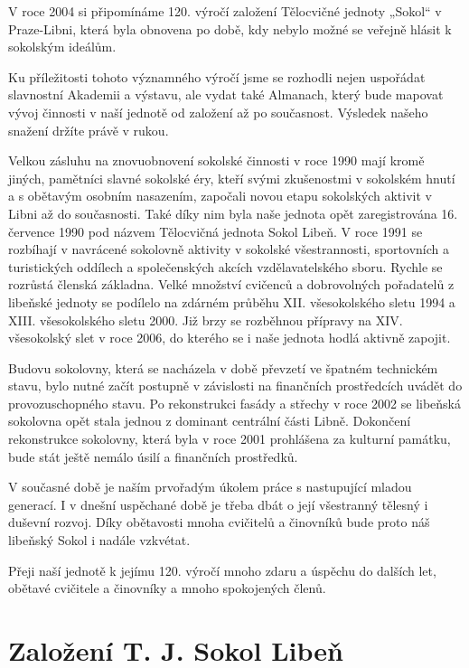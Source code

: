 V roce 2004 si připomínáme 120. výročí založení Tělocvičné jednoty
„Sokol`` v Praze-Libni, která byla obnovena po době, kdy nebylo možné se
veřejně hlásit k sokolským ideálům.

Ku příležitosti tohoto významného výročí jsme se rozhodli nejen
uspořádat slavnostní Akademii a výstavu, ale vydat také Almanach, který
bude mapovat vývoj činnosti v naší jednotě od založení až po současnost.
Výsledek našeho snažení držíte právě v rukou.

Velkou zásluhu na znovuobnovení sokolské činnosti v roce 1990 mají kromě
jiných, pamětníci slavné sokolské éry, kteří svými zkušenostmi v
sokolském hnutí a s obětavým osobním nasazením, započali novou etapu
sokolských aktivit v Libni až do současnosti. Také díky nim byla naše
jednota opět zaregistrována 16. července 1990 pod názvem Tělocvičná
jednota Sokol Libeň. V roce 1991 se rozbíhají v navrácené sokolovně
aktivity v sokolské všestrannosti, sportovních a turistických oddílech a
společenských akcích vzdělavatelského sboru. Rychle se rozrůstá členská
základna. Velké množství cvičenců a dobrovolných pořadatelů z libeňské
jednoty se podílelo na zdárném průběhu XII. všesokolského sletu 1994 a
XIII. všesokolského sletu 2000. Již brzy se rozběhnou přípravy na XIV.
všesokolský slet v roce 2006, do kterého se i naše jednota hodlá aktivně
zapojit.

Budovu sokolovny, která se nacházela v době převzetí ve špatném
technickém stavu, bylo nutné začít postupně v závislosti na finančních
prostředcích uvádět do provozuschopného stavu. Po rekonstrukci fasády a
střechy v roce 2002 se libeňská sokolovna opět stala jednou z dominant
centrální části Libně. Dokončení rekonstrukce sokolovny, která byla v
roce 2001 prohlášena za kulturní památku, bude stát ještě nemálo úsilí a
finančních prostředků.

V současné době je naším prvořadým úkolem práce s nastupující mladou
generací. I v dnešní uspěchané době je třeba dbát o její všestranný
tělesný i duševní rozvoj. Díky obětavosti mnoha cvičitelů a činovníků
bude proto náš libeňský Sokol i nadále vzkvétat.

Přeji naší jednotě k jejímu 120. výročí mnoho zdaru a úspěchu do dalších
let, obětavé cvičitele a činovníky a mnoho spokojených členů.

\section{Založení T. J. Sokol
Libeň}\label{zaloux17eenuxed-t.-j.-sokol-libeux148}

